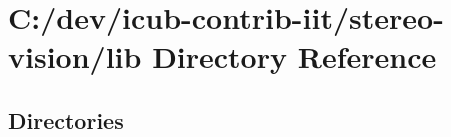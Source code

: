 \section{C\+:/dev/icub-\/contrib-\/iit/stereo-\/vision/lib Directory Reference}
\label{dir_97aefd0d527b934f1d99a682da8fe6a9}
\subsection*{Directories}
\begin{DoxyCompactItemize}
\end{DoxyCompactItemize}
